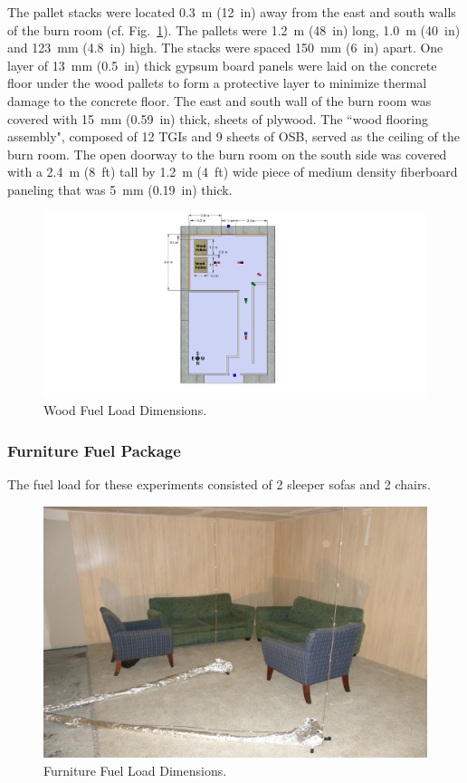 \documentclass[12pt,oneside]{book}
\begin{document}
The pallet stacks were located 0.3~m (12~in) away from the east and south walls of the burn room (cf. Fig.~\ref{fig:Wood_Fuel_Load_Dimensions}). The pallets were 1.2~m (48~in) long, 1.0~m (40~in) and 123~mm (4.8~in) high. The stacks were spaced 150~mm (6~in) apart. One layer of 13~mm (0.5~in) thick gypsum board panels were laid on the concrete floor under the wood pallets to form a protective layer to minimize thermal damage to the concrete floor. The east and south wall of the burn room was covered with 15~mm (0.59~in) thick, sheets of plywood.  The ``wood flooring assembly", composed of 12 TGIs and 9 sheets of OSB, served as the ceiling of the burn room. The open doorway to the burn room on the south side was covered with a 2.4~m (8~ft) tall by 1.2~m (4~ft) wide piece of medium density fiberboard paneling that was 5~mm (0.19~in) thick.

\begin{figure}[!ht]
	\includegraphics[width=.8\columnwidth]{../Figures/Pictures/DelCoSingleStoryWoodFuelLoad}
	\caption{Wood Fuel Load Dimensions.}
	\label{fig:Wood_Fuel_Load_Dimensions}
\end{figure}

\clearpage

\subsubsection{Furniture Fuel Package}
\label{sec:fire_suppression_furniture_fuel}

The fuel load for these experiments consisted of 2 sleeper sofas and 2 chairs.

\begin{figure}[!ht]
	\includegraphics[width=.8\columnwidth]{../Figures/Pictures/Furniture_Fuel_Load}
	\caption{Furniture Fuel Load Dimensions.}
	\label{fig:Furniture_Fuel_Load}
\end{figure}
\end{document}

